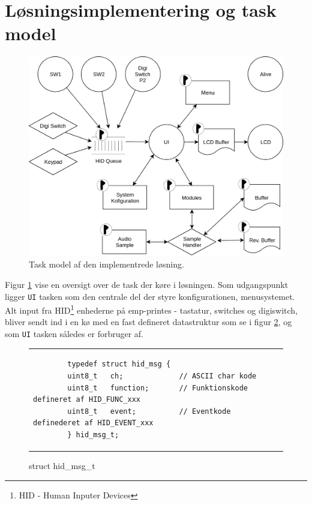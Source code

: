 \section{Løsningsimplementering og task model}
\begin{figure}[h]
	\centering
	\includegraphics[width=.9\linewidth]{billeder/taskmodel.png}
	\caption{Task model af den implementrede løsning.}
	\label{fig:taskmodel}
\end{figure}
Figur \ref{fig:taskmodel} vise en oversigt over de task der køre i løsningen.
Som udgangspunkt ligger \texttt{UI} tasken som den centrale del der styre konfigurationen, menusystemet.
Alt input fra HID\footnote{HID - Human Inputer Devices} enhederne på emp-printes - tastatur, switches og digiswitch, bliver sendt ind i en kø med en fast defineret datastruktur som se i figur \ref{fig:hid_msg_t}, og som \texttt{UI} tasken således er forbruger af.
\begin{figure}[h!]
\begin{tabular}{l}
	\begin{lstlisting}
		typedef struct hid_msg {
		uint8_t   ch;             // ASCII char kode
		uint8_t   function;       // Funktionskode defineret af HID_FUNC_xxx
		uint8_t   event;          // Eventkode definederet af HID_EVENT_xxx
		} hid_msg_t;
	\end{lstlisting}
\end{tabular}
\caption{struct hid\_msg\_t}
\label{fig:hid_msg_t}
\end{figure}

